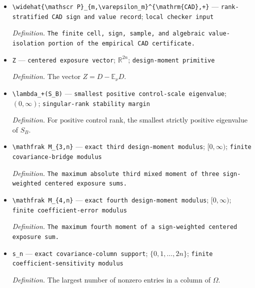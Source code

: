 \documentclass{article}
\begin{document}
\begin{itemize}
  \item \texttt{\textbackslash{}\allowbreak{}widehat\{\textbackslash{}\allowbreak{}mathscr P\}\allowbreak{}\_\allowbreak{}\{m,\allowbreak{}\textbackslash{}\allowbreak{}varepsilon\_\allowbreak{}m\}\allowbreak{}\textasciicircum{}\{\textbackslash{}\allowbreak{}mathrm\{CAD\}\allowbreak{},\allowbreak{}+\allowbreak{}\}\allowbreak{}} --- \texttt{rank-\allowbreak{}stratified CAD sign and value record}; \texttt{local checker input}
  \par\smallskip\noindent\emph{Definition.} \texttt{The finite cell,\allowbreak{} sign,\allowbreak{} sample,\allowbreak{} and algebraic value-\allowbreak{}isolation portion of the empirical CAD certificate.}
  \item \texttt{Z} --- \texttt{centered exposure vector}; \(\mathbb R^{2n}\); \texttt{design-\allowbreak{}moment primitive}
  \par\smallskip\noindent\emph{Definition.} The vector \(Z=D-\mathbb E_\nu D\).
  \item \texttt{\textbackslash{}\allowbreak{}lambda\_\allowbreak{}+\allowbreak{}(S\_\allowbreak{}B)} --- \texttt{smallest positive control-\allowbreak{}scale eigenvalue}; \((0,\infty)\); \texttt{singular-\allowbreak{}rank stability margin}
  \par\smallskip\noindent\emph{Definition.} For positive control rank, the smallest strictly positive eigenvalue of \(S_B\).
  \item \texttt{\textbackslash{}\allowbreak{}mathfrak M\_\allowbreak{}\{3,\allowbreak{}n\}\allowbreak{}} --- \texttt{exact third design-\allowbreak{}moment modulus}; \([0,\infty)\); \texttt{finite covariance-\allowbreak{}bridge modulus}
  \par\smallskip\noindent\emph{Definition.} \texttt{The maximum absolute third mixed moment of three sign-\allowbreak{}weighted centered exposure sums.}
  \item \texttt{\textbackslash{}\allowbreak{}mathfrak M\_\allowbreak{}\{4,\allowbreak{}n\}\allowbreak{}} --- \texttt{exact fourth design-\allowbreak{}moment modulus}; \([0,\infty)\); \texttt{finite coefficient-\allowbreak{}error modulus}
  \par\smallskip\noindent\emph{Definition.} \texttt{The maximum fourth moment of a sign-\allowbreak{}weighted centered exposure sum.}
  \item \texttt{s\_\allowbreak{}n} --- \texttt{exact covariance-\allowbreak{}column support}; \(\{0,1,\ldots,2n\}\); \texttt{finite coefficient-\allowbreak{}sensitivity modulus}
  \par\smallskip\noindent\emph{Definition.} The largest number of nonzero entries in a column of \(\Omega\).

\end{itemize}
\end{document}

